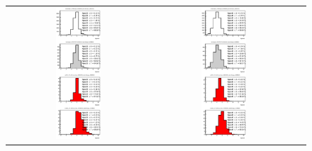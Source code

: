 
\begin{figure}[htbp]
\begin{center}
\begin{tabular}{ccc}
%
\includegraphics[width=0.33\textwidth]{appendices/figures/htx_httail/blinding_on_Njets30__ELEMUON_6jetin2btagex_NOMINAL.eps} &
\includegraphics[width=0.33\textwidth]{appendices/figures/htx_httail/blinding_on_Njets45__ELEMUON_6jetin2btagex_NOMINAL.eps} &

\end{tabular}
\end{center}
\end{figure}
